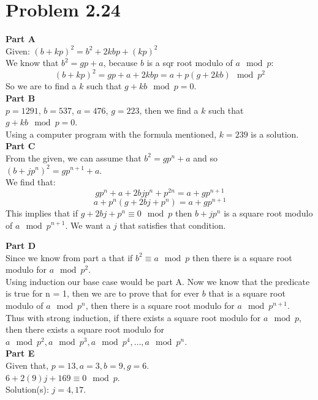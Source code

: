 \documentclass[10pt]{amsart}
\begin{document}
\section*{\large \textbf{Problem 2.24}}
\begin{addmargin}{5pt}
\noindent \textbf{\small Part A} \\
Given: $(b + kp)^2 = b^2 + 2kbp + (kp)^2$ \\
We know that $b^2 = gp + a$, because $b$ is a sqr root modulo of $a \mod p$:
\[ (b + kp)^2 = gp + a + 2kbp = a + p(g + 2kb) \mod p^2\]
So we are to find a $k$ such that $g + kb \mod p = 0$.  \\

\noindent \textbf{\small Part B} \\
$p = 1291$, $b=537$, $a = 476$, $g = 223$, then we find a $k$ such that
$g + kb \mod p = 0$. \\
Using a computer program with the formula mentioned, $k=239$ is a solution.\\

\noindent \textbf{\small Part C} \\
From the given, we can assume that $b^2 = gp^n + a$ and so $(b + jp^n)^2 = gp^{n+1} + a$.
\\
We find that:
\[gp^n + a + 2bjp^n + p^{2n} = a + gp^{n+1}\]
\[a + p^n(g + 2bj + p^n) = a + gp^{n+1}\]
This implies that if $g + 2bj + p^n \equiv 0 \mod p$ then $b + jp^n$ is a square
root modulo of $a \mod p^{n+1}$. We want a $j$ that satisfies that condition.

\noindent \textbf{\small Part D} \\
Since we know from part a that if $b^2 \equiv a \mod p$ then there is a square root
modulo for $a \mod p^2$. \\

Using induction our base case would be part A.
Now we know that the predicate is true for n = 1, then we are to prove that
for ever $b$ that is a square root modulo of $a \mod p^n$, then there is a square
root modulo for $a \mod p^{n+1}$. \\

Thus with strong induction, if there exists a square root modulo for $a \mod p$, then
there exists a square root modulo for $a \mod p^{2}, a \mod p^{3}, a \mod p^{4}, \ldots,
a \mod p^n$. \\

\noindent \textbf{\small Part E} \\
Given that, $p = 13, a = 3, b = 9, g = 6$. \\
$6 + 2(9)j + 169 \equiv 0 \mod p$. \\
Solution(s): $j = 4, 17$. \\
\end{addmargin}
\end{document}
